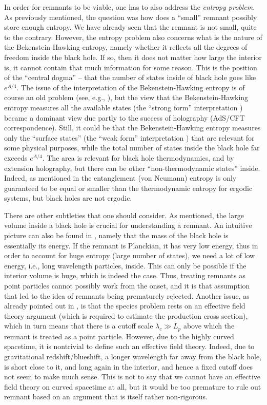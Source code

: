 \documentclass[12pt,preprintnumbers, floatfix, preprintnumbers, letterpaper, superscriptaddress,nofootinbib]{revtex4-2}
\begin{document}
In order for remnants to be viable, one has to also address the \emph{entropy problem}. As previously mentioned, the question was how does a ``small'' remnant possibly store enough entropy. We have already seen that the remnant is not small, quite to the contrary. However, the entropy problem also concerns what is the nature of the Bekenstein-Hawking entropy, namely whether it reflects all the degrees of freedom inside the black hole. If so, then it does not matter how large the interior is, it cannot contain that much information for some reason. This is the position of the ``central dogma'' -- that the number of states inside of black hole goes like $e^{A/4}$. The issue of the interpretation of the Bekenstein-Hawking entropy is of course an old problem (see, e.g., \cite{0501103}), but the view that the Bekenstein-Hawking entropy measures all the available states (the ``strong form'' interpretation \cite{0901.3156}) became a dominant view due partly to the success of holography (AdS/CFT correspondence). Still, it could be that the Bekenstein-Hawking entropy measures only the ``surface states'' (the ``weak form'' interpretation \cite{0901.3156}) that are relevant for some physical purposes, while the total number of states inside the black hole far exceeds $e^{A/4}$. The area is relevant for black hole thermodynamics, and by extension holography, but there can be other ``non-thermodynamic states'' inside.
Indeed, as mentioned in \cite{2407.09584} the entanglement (von Neumann) entropy is only guaranteed to be equal or smaller than the thermodynamic entropy for ergodic systems, but black holes are not ergodic. 

There are other subtleties that one should consider. As mentioned, the large volume inside a black hole is crucial for understanding a remnant. An intuitive picture can also be found in \cite{2407.09584}, namely that the mass of the black hole is essentially its energy. If the remnant is Planckian, it has very low energy, thus in order to account for huge entropy (large number of states), we need a lot of low energy, i.e., long wavelength particles, inside. This can only be possible if the interior volume is huge, which is indeed the case. Thus, treating remnants as point particles cannot possibly work from the onset, and it is that assumption that led to the idea of remnants being prematurely rejected. Another issue, as already pointed out in \cite{0901.3156}, is that the species problem rests on an effective field theory argument (which is required to estimate the production cross section), which in turn means that there is a cutoff scale $\lambda_c \gg L_p$ above which the remnant is treated as a point particle. However, due to the highly curved spacetime, it is nontrivial to define such an effective field theory. Indeed, due to gravitational redshift/blueshift, a longer wavelength far away from the black hole, is short close to it, and long again in the interior, and hence a fixed cutoff does not seem to make much sense. This is not to say that we cannot have an effective field theory on curved spacetime at all, but it would be too premature to rule out remnant based on an argument that is itself rather non-rigorous. 
\end{document}

